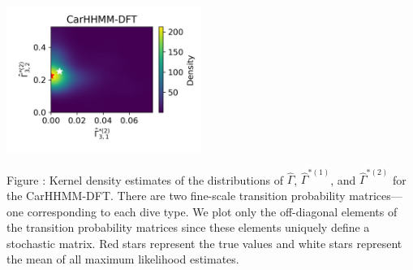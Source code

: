 \documentclass{article}
\begin{document}
\begin{center}
        \includegraphics[width=2.5in]{../Plots/hhmm_FV_Gamma_density_1_row_2.png}
        \end{center}
        
        \noindent Figure : Kernel density estimates of the distributions of $\hat \Gamma$, $\hat \Gamma^{*(1)}$, and $\hat \Gamma^{*(2)}$ for the CarHHMM-DFT. There are two fine-scale transition probability matrices---one corresponding to each dive type. We plot only the off-diagonal elements of the transition probability matrices since these elements uniquely define a stochastic matrix. Red stars represent the true values and white stars represent the mean of all maximum likelihood estimates.
        \addtocounter{fignum}{1}
        
        \newpage
\end{document}
